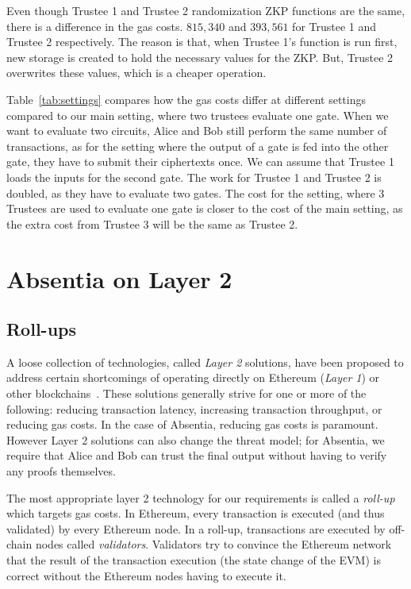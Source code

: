 Even though Trustee 1 and Trustee 2 randomization ZKP functions are the same, there is a difference in the gas costs. $815,340$ and $393,561$ for Trustee 1 and Trustee 2 respectively. The reason is that, when Trustee 1's function is run first, new storage is created to hold the necessary values for the ZKP. But, Trustee 2 overwrites these values, which is a cheaper operation.

Table~\ref{tab:settings} compares how the gas costs differ at different settings compared to our main setting, where two trustees evaluate one gate. When we want to evaluate two circuits, Alice and Bob still perform the same number of transactions, as for the setting where the output of a gate is fed into the other gate, they have to submit their ciphertexts once. We can assume that Trustee 1 loads the inputs for the second gate. The work for Trustee 1 and Trustee 2 is doubled, as they have to evaluate two gates. The cost for the setting, where 3 Trustees are used to evaluate one gate is closer to the cost of the main setting, as the extra cost from Trustee 3 will be the same as Trustee 2.




\section{Absentia on Layer 2 }
\label{sec:arb}

\subsection{Roll-ups}

A loose collection of technologies, called \emph{Layer 2} solutions, have been proposed to address certain shortcomings of operating directly on Ethereum (\emph{Layer 1}) or other blockchains~\cite{GMR+20}. These solutions generally strive for one or more of the following: reducing transaction latency, increasing transaction throughput, or reducing gas costs. In the case of Absentia, reducing gas costs is paramount. However Layer 2 solutions can also change the threat model; for Absentia, we require that Alice and Bob can trust the final output without having to verify any proofs themselves. 

The most appropriate layer 2 technology for our requirements is called a \emph{roll-up} which targets gas costs. In Ethereum, every transaction is executed (and thus validated) by every Ethereum node. In a roll-up, transactions are executed by off-chain nodes called \emph{validators}. Validators try to convince the Ethereum network that the result of the transaction execution (\ie the state change of the EVM) is correct without the Ethereum nodes having to execute it. 

